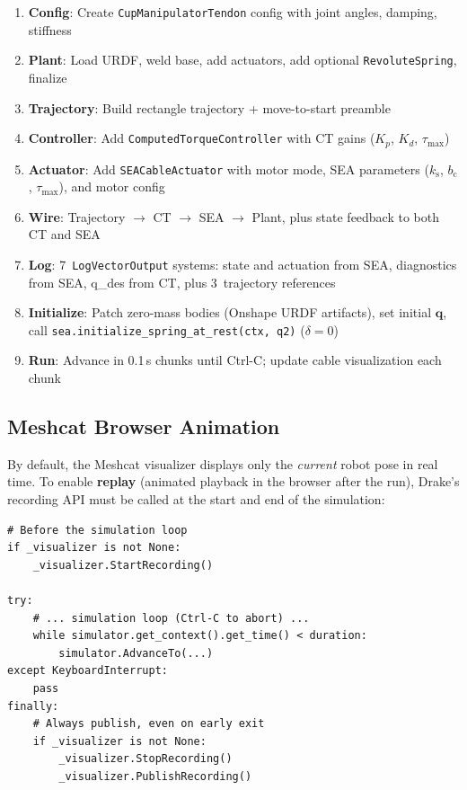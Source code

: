 \documentclass[11pt,a4paper]{article}
\newcommand{\bq}{\bm{q}}
\newcommand{\ks}{k_{\mathrm{s}}}
\newcommand{\bc}{b_{\mathrm{c}}}
\begin{document}
\begin{enumerate}[leftmargin=2em]
    \item \textbf{Config}: Create \texttt{CupManipulatorTendon} config with joint angles, damping, stiffness
    \item \textbf{Plant}: Load URDF, weld base, add actuators, add optional \texttt{RevoluteSpring}, finalize
    \item \textbf{Trajectory}: Build rectangle trajectory + move-to-start preamble
    \item \textbf{Controller}: Add \texttt{ComputedTorqueController} with CT gains ($K_p$, $K_d$, $\tau_{\max}$)
    \item \textbf{Actuator}: Add \texttt{SEACableActuator} with motor mode, SEA parameters ($\ks$, $\bc$, $\tau_{\max}$), and motor config
    \item \textbf{Wire}: Trajectory $\to$ CT $\to$ SEA $\to$ Plant, plus state feedback to both CT and SEA
    \item \textbf{Log}: 7~\texttt{LogVectorOutput} systems: state and actuation from SEA, diagnostics from SEA, q\_des from CT, plus 3~trajectory references
    \item \textbf{Initialize}: Patch zero-mass bodies (Onshape URDF artifacts), set initial $\bq$, call \texttt{sea.initialize\_spring\_at\_rest(ctx, q2)} ($\delta = 0$)
    \item \textbf{Run}: Advance in 0.1\,s chunks until Ctrl-C; update cable visualization each chunk
\end{enumerate}

\subsection{Meshcat Browser Animation}
\label{sec:meshcat_recording}

By default, the Meshcat visualizer displays only the \emph{current} robot
pose in real time.  To enable \textbf{replay} (animated playback in the
browser after the run), Drake's recording API must be called at the start and
end of the simulation:

\begin{lstlisting}[caption={Meshcat recording: wrap the simulation loop.}]
# Before the simulation loop
if _visualizer is not None:
    _visualizer.StartRecording()

try:
    # ... simulation loop (Ctrl-C to abort) ...
    while simulator.get_context().get_time() < duration:
        simulator.AdvanceTo(...)
except KeyboardInterrupt:
    pass
finally:
    # Always publish, even on early exit
    if _visualizer is not None:
        _visualizer.StopRecording()
        _visualizer.PublishRecording()
\end{lstlisting}
\end{document}
